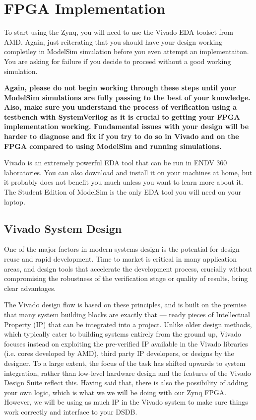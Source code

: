 \documentclass{article}
\begin{document}
\section{FPGA Implementation}

To start using the Zynq, you will need to use the Vivado EDA toolset
from AMD.  Again, just reiterating that you should have your design
working completley in ModelSim simulation before you even attempt an
implementaiton.  You are asking for failure if you decide to proceed
without a good working simulation.

\textbf{Again, please do not begin working through these steps until
  your ModelSim  
  simulations are fully passing to the best of your knowledge.
  Also, make sure you understand the process of verification using a
  testbench with SystemVerilog as it is crucial to getting your FPGA
  implementation working.  Fundamental issues
  with your design will be harder to diagnose and fix if you try to do so in
  Vivado and on the FPGA compared to using ModelSim and running
  simulations.}

Vivado is an extremely powerful EDA tool that can be run in ENDV 360
laboratories.  You can also download and install it on your machines
at home, but it probably does not benefit you much unless you want to
learn more about it.  The Student Edition of ModelSim is the only EDA
tool you will need on your laptop.

\subsection{Vivado System Design}

One of the major factors in modern systems design is the potential for design reuse and
rapid development. Time to market is critical in many application areas, and design tools
that accelerate the development process, crucially without compromising the robustness of
the verification stage or quality of results, bring clear advantages.

The Vivado design flow is based on these principles, and is built on the premise that
many system building blocks are exactly that — ready pieces of
Intellectual Property (IP) that can be integrated
into a project. Unlike older design methods, which typically cater to building systems
entirely from the ground up, Vivado focuses instead on exploiting the pre-verified IP
available in the Vivado libraries (i.e. cores developed by AMD), third party IP developers,
or designs by the designer. To a large extent, the focus
of the task has shifted upwards to system integration, rather than low-level hardware
design and the features of the Vivado Design Suite reflect this. Having said that, there is
also the possibility of adding your own logic, which is what we we
will be doing with our Zynq FPGA.  However, we will be using as much
IP in the Vivado system to make sure things work correctly and
interface to your DSDB.
\end{document}
